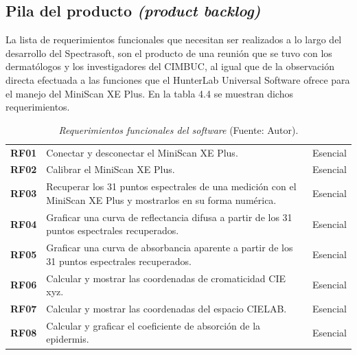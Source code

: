\subsection{Pila del producto \textit{(product backlog)}}
	La lista de requerimientos funcionales que necesitan ser realizados a lo largo del desarrollo del Spectrasoft, son el producto de una reuni\'{o}n que se tuvo con los dermat\'{o}logos y los investigadores del CIMBUC, al igual que de la observaci\'{o}n directa efectuada a las funciones que el HunterLab Universal Software ofrece para el manejo del MiniScan XE Plus. En la tabla 4.4 se muestran dichos requerimientos.
	
	\begin{table}[h]
		\small
		\caption[Requerimientos funcionales del software]{\textit{Requerimientos funcionales del software} (Fuente: Autor).}
		\centering
		\setlength{\extrarowheight}{\altocelda}
		\begin{tabulary}{\anchotabla}{|c|J|c|}
			\hline
			 &  & \\ \hline
			
			\textbf{RF01} & Conectar y desconectar el MiniScan XE Plus. & Esencial\\ \hline
			
			\textbf{RF02} & Calibrar el MiniScan XE Plus. & Esencial\\ \hline
			
			\textbf{RF03} & Recuperar los 31 puntos espectrales de una medici\'{o}n con el MiniScan XE Plus y mostrarlos en su forma num\'{e}rica. & Esencial\\ \hline

			\textbf{RF04} & Graficar una curva de reflectancia difusa a partir de los 31 puntos espectrales recuperados. & Esencial\\ \hline
			\textbf{RF05} & Graficar una curva de absorbancia aparente a partir de los 31 puntos espectrales recuperados. & Esencial\\ \hline
			\textbf{RF06} & Calcular y mostrar las coordenadas de cromaticidad CIE xyz. & Esencial\\ \hline
			
			\textbf{RF07} & Calcular y mostrar las coordenadas del espacio CIELAB. & Esencial\\ \hline

			\textbf{RF08} & Calcular y graficar el coeficiente de absorci\'{o}n de la epidermis. & Esencial\\ \hline


\end{tabulary}
\end{table}
